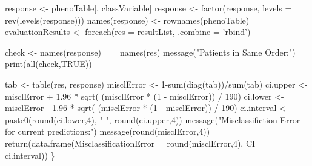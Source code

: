 \documentclass[]{article}
\newenvironment{Shaded}{\begin{snugshade}}{\end{snugshade}}
\newcommand{\DataTypeTok}[1]{\textcolor[rgb]{0.87,0.87,0.75}{#1}}
\newcommand{\DecValTok}[1]{\textcolor[rgb]{0.86,0.86,0.80}{#1}}
\newcommand{\FloatTok}[1]{\textcolor[rgb]{0.75,0.75,0.82}{#1}}
\newcommand{\KeywordTok}[1]{\textcolor[rgb]{0.94,0.87,0.69}{#1}}
\newcommand{\NormalTok}[1]{\textcolor[rgb]{0.80,0.80,0.80}{#1}}
\newcommand{\OperatorTok}[1]{\textcolor[rgb]{0.94,0.94,0.82}{#1}}
\newcommand{\OtherTok}[1]{\textcolor[rgb]{0.94,0.94,0.56}{#1}}
\newcommand{\StringTok}[1]{\textcolor[rgb]{0.80,0.58,0.58}{#1}}
\begin{document}
\begin{Shaded}
\begin{Highlighting}[]
\NormalTok{response <-}\StringTok{ }\NormalTok{phenoTable[, classVariable]}
\NormalTok{response <-}\StringTok{ }\KeywordTok{factor}\NormalTok{(response, }\DataTypeTok{levels =} \KeywordTok{rev}\NormalTok{(}\KeywordTok{levels}\NormalTok{(response)))}
\KeywordTok{names}\NormalTok{(response) <-}\StringTok{ }\KeywordTok{rownames}\NormalTok{(phenoTable)}
\NormalTok{evaluationResults <-}\StringTok{ }\KeywordTok{foreach}\NormalTok{(}\DataTypeTok{res =}\NormalTok{ resultList, }\DataTypeTok{.combine =} \StringTok{'rbind'}\NormalTok{) }\OperatorTok{%do%}\StringTok{ }\NormalTok{\{}
\NormalTok{  check <-}\StringTok{ }\KeywordTok{names}\NormalTok{(response) }\OperatorTok{==}\StringTok{ }\KeywordTok{names}\NormalTok{(res)}
  \KeywordTok{message}\NormalTok{(}\StringTok{"Patients in Same Order:"}\NormalTok{)}
  \KeywordTok{print}\NormalTok{(}\KeywordTok{all}\NormalTok{(check,}\OtherTok{TRUE}\NormalTok{))}
 
\NormalTok{  tab <-}\StringTok{ }\KeywordTok{table}\NormalTok{(res, response)}
\NormalTok{  misclError <-}\StringTok{ }\DecValTok{1}\OperatorTok{-}\KeywordTok{sum}\NormalTok{(}\KeywordTok{diag}\NormalTok{(tab))}\OperatorTok{/}\KeywordTok{sum}\NormalTok{(tab)}
\NormalTok{  ci.upper <-}\StringTok{ }\NormalTok{misclError }\OperatorTok{+}\StringTok{ }\FloatTok{1.96} \OperatorTok{*}\StringTok{ }\KeywordTok{sqrt}\NormalTok{( (misclError }\OperatorTok{*}\StringTok{ }\NormalTok{(}\DecValTok{1} \OperatorTok{-}\StringTok{ }\NormalTok{misclError)) }\OperatorTok{/}\StringTok{ }\DecValTok{190}\NormalTok{)}
\NormalTok{  ci.lower <-}\StringTok{ }\NormalTok{misclError }\OperatorTok{-}\StringTok{ }\FloatTok{1.96} \OperatorTok{*}\StringTok{ }\KeywordTok{sqrt}\NormalTok{( (misclError }\OperatorTok{*}\StringTok{ }\NormalTok{(}\DecValTok{1} \OperatorTok{-}\StringTok{ }\NormalTok{misclError)) }\OperatorTok{/}\StringTok{ }\DecValTok{190}\NormalTok{)}
\NormalTok{  ci.interval <-}\StringTok{ }\KeywordTok{paste0}\NormalTok{(}\KeywordTok{round}\NormalTok{(ci.lower,}\DecValTok{4}\NormalTok{), }\StringTok{"-"}\NormalTok{, }\KeywordTok{round}\NormalTok{(ci.upper,}\DecValTok{4}\NormalTok{))}
  \KeywordTok{message}\NormalTok{(}\StringTok{"Misclassifiction Error for current predictions:"}\NormalTok{)}
  \KeywordTok{message}\NormalTok{(}\KeywordTok{round}\NormalTok{(misclError,}\DecValTok{4}\NormalTok{))}
  \KeywordTok{return}\NormalTok{(}\KeywordTok{data.frame}\NormalTok{(}\DataTypeTok{MisclassificationError =} \KeywordTok{round}\NormalTok{(misclError,}\DecValTok{4}\NormalTok{), }\DataTypeTok{CI =}\NormalTok{ ci.interval))}
\NormalTok{\}}

}
\end{Highlighting}
\end{Shaded}
\end{document}
